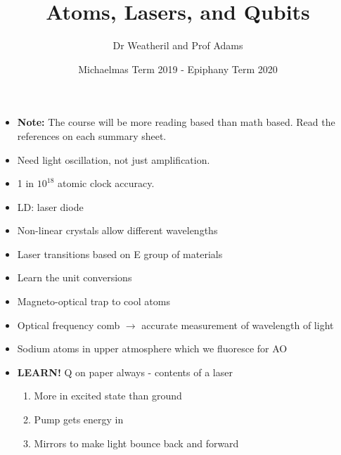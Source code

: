 \documentclass[a4paper, 11pt, normalem]{report}
\title{Atoms, Lasers, and Qubits \vspace{-20pt}}
\author{Dr Weatheril and Prof Adams}
\date{\vspace{-15pt}Michaelmas Term 2019 - Epiphany Term 2020}
\begin{document}
\maketitle

\part{}
\chapter{}
\begin{itemize}
    \item \textbf{Note:} The course will be more reading based than math based. 
Read the references on each summary sheet. 
    \item Need light oscillation, not just amplification.  
    \item 1 in $10^{18}$ atomic clock accuracy.
    \item LD: laser diode
    \item Non-linear crystals allow different wavelengths
    \item Laser transitions based on E group of materials
    \item Learn the unit conversions
    \item Magneto-optical trap to cool atoms
    \item Optical frequency comb $\to$ accurate measurement of wavelength of light 
    \item Sodium atoms in upper atmosphere which we fluoresce for AO
    \item \textbf{LEARN!} Q on paper always - contents of a laser
        \begin{enumerate}
            \item More in excited state than ground
            \item Pump gets energy in
            \item Mirrors to make light bounce back and forward
        \end{enumerate}
\end{itemize}
\end{document}
